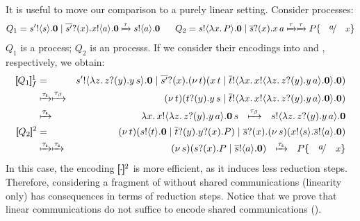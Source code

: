 \documentclass[runningheads]{llncs}
\begin{document}
{{It is useful to move our comparison 
to a purely linear setting. %
Consider processes:
\begin{eqnarray*}
	Q_1  =  \bout{s'}{s} \inact \Par \binp{\dual{s'}}{x} \bout{x}{a} \inact
	\hby{\tau}
	\bout{s}{a} \inact \quad~~
	Q_2  =  \bout{s}{\abs{x}{P}} \inact \Par \binp{\dual{s}}{x} \appl{x}{a}
	\hby{\tau}
	\hby{\tau}
	P \subst{a}{x}
\end{eqnarray*}
$Q_1$ is a \sessp process; $Q_2$ is an \HO processs.
If we consider their encodings into \HO and \sessp, respectively,
we obtain:
\begin{eqnarray*}
	\map{Q_1}_f^{1} & = & \bout{s'}{\abs{z}{\binp{z}{y} \appl{y}{s}}} \inact \Par \binp{\dual{s'}}{x} \newsp{t}{\appl{x}{t} \Par \bout{\dual{t}}{\abs{x}{\bout{x}{\abs{z}{\binp{z}{y} \appl{y}{a}}} \inact}} \inact}\\
	& \hby{\stau} \hby{\btau}& 
	\newsp{t}{\binp{t}{y} \appl{y}{s} \Par \bout{\dual{t}}{\abs{x}{\bout{x}{\abs{z}{\binp{z}{y} \appl{y}{a}}} \inact}} \inact}\\
	& \hby{\stau} & 
	\appl{\abs{x}{\bout{x}{\abs{z}{\binp{z}{y} \appl{y}{a}}} \inact}}{s}
	~~\hby{\btau}~~
	\bout{s}{\abs{z}{\binp{z}{y} \appl{y}{a}}} \inact \\
	\pmap{Q_2}{2} & = & \newsp{t}{\bout{s}{t} \inact \Par \binp{\dual{t}}{y} \binp{y}{x} P} \Par \binp{\dual{s}}{x} \newsp{s}{\bout{x}{s} \bout{\dual{s}}{a} \inact}
	\\
	& \hby{\stau} \hby{\stau} & 
	\newsp{s}{\binp{s}{x} P \Par \bout{\dual{s}}{a} \inact}
	~~
	\hby{\stau} ~~
	P\subst{a}{x}
\end{eqnarray*}
In this case, the encoding $[\!\![\cdot]\!\!]^2$ is more efficient, as it induces less reduction steps.
Therefore, considering a fragment of \HOp without shared communications (linearity only)
has consequences in terms of reduction steps. Notice that we prove that linear communications do 
not suffice to encode shared communications ().

}}
\end{document}
